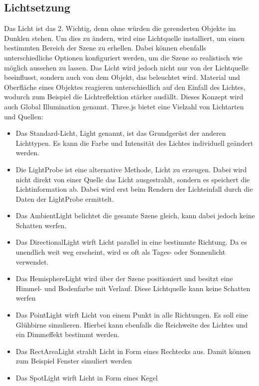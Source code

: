 \subsection{Lichtsetzung}
Das Licht ist das 2. Wichtig, denn ohne würden die gerenderten Objekte im Dunklen stehen. Um dies zu ändern, wird eine Lichtquelle installiert, um einen bestimmten Bereich der Szene zu erhellen. Dabei können ebenfalls unterschiedliche Optionen konfiguriert werden, um die Szene so realistisch wie möglich aussehen zu lassen. Das Licht wird jedoch nicht nur von der Lichtquelle beeinflusst, sondern auch von dem Objekt, das beleuchtet wird. Material und Oberfläche eines Objektes reagieren unterschiedlich auf den Einfall des Lichtes, wodurch zum Beispiel die Lichtreflektion stärker ausfällt. Dieses Konzept wird auch Global Illumination genannt. Three.js bietet eine Vielzahl von Lichtarten und Quellen:

\begin{itemize}
    \item Das Standard-Licht, Light genannt, ist das Grundgerüst der anderen Lichttypen. Es kann die Farbe und Intensität des Lichtes individuell geändert werden. \cite{StandardLight}
    \item Die LightProbe ist eine alternative Methode, Licht zu erzeugen. Dabei wird nicht direkt von einer Quelle das Licht ausgestrahlt, sondern es speichert die Lichtinformation ab. Dabei wird erst beim Rendern der Lichteinfall durch die Daten der LightProbe ermittelt.  \cite{LightProbe}
    \item Das AmbientLight belichtet die gesamte Szene gleich, kann dabei jedoch keine Schatten werfen. \cite{AmbientLight}
    \item Das DirectionalLight wirft Licht parallel in eine bestimmte Richtung. Da es unendlich weit weg erscheint, wird es oft als Tages- oder Sonnenlicht verwendet. \cite{DirectionalLight}
    \item Das HemisphereLight wird über der Szene positioniert und besitzt eine Himmel- und Bodenfarbe mit Verlauf. Diese Lichtquelle kann keine Schatten werfen \cite{HemisphereLight}
    \item Das PointLight wirft Licht von einem Punkt in alle Richtungen. Es soll eine Glühbirne simulieren. Hierbei kann ebenfalls die Reichweite des Lichtes und ein Dimmeffekt bestimmt werden. \cite{PointLight}
    \item Das RectAreaLight strahlt Licht in Form eines Rechtecks aus. Damit können zum Beispiel Fenster simuliert werden \cite{ReactAreaLight}
    \item Das SpotLight wirft Licht in Form eines Kegel \cite{SpotLight}
\end{itemize}

